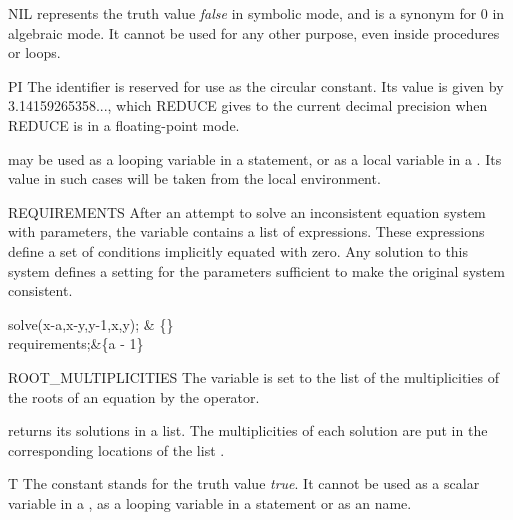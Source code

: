 \begin{Constant}[nil]{NIL}
 represents the truth value {\it false} in symbolic mode, and is
a synonym for 0 in algebraic mode.  It cannot be used for any other
purpose, even inside procedures or  loops.
\end{Constant}


\begin{Constant}[pi]{PI}
The identifier  is reserved for use as the circular constant.
Its value is given by 3.14159265358..., which REDUCE gives to the current
decimal precision when REDUCE is in a floating-point mode.

\begin{Comments}
 may be used as a looping variable in a  statement,
or as a local variable in a .  Its value in such cases
will be taken from the local environment.
\end{Comments}
\end{Constant}

\begin{Variable}[requirements]{REQUIREMENTS}
After an attempt to solve an inconsistent equation system
with parameters, the variable  contains a list 
of expressions. These expressions define a set of conditions implicitly
equated with zero. Any solution to this system defines a setting for
the parameters sufficient to make the original system consistent.
\begin{Examples}
solve({x-a,x-y,y-1},{x,y}); & \{\}\\
requirements;&\{a - 1\}
\end{Examples}
\end{Variable}

\begin{Variable}{ROOT\_MULTIPLICITIES}
The  variable is set to the list of the
multiplicities of the roots of an equation by the  operator.

\begin{Comments}
 returns its solutions in a list.  The multiplicities of
each solution are put in the corresponding locations of the list
.
\end{Comments}
\end{Variable}


\begin{Constant}[t]{T}
The constant  stands for the truth value {\it true}.  It cannot be used
as a scalar variable in a , as a looping variable in a
 statement or as an  name.

\end{Constant}

